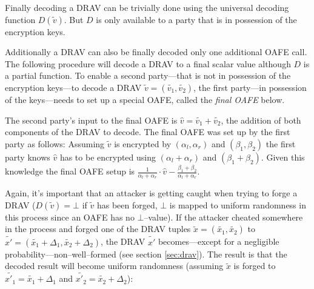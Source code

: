 \label{sec:drav-final-decoding}

Finally decoding a DRAV can be trivially done using the universal decoding
function $D(\widetilde{v})$. But $D$ is only available to a party that is in
possession of the encryption keys.

Additionally a DRAV can also be finally decoded only one additional OAFE call.
The following procedure will decode a DRAV to a final scalar value although
$D$ is a partial function. To enable a second party---that is not in possession
of the encryption keys---to decode a DRAV $\widetilde{v} = (\widetilde{v_1},
\widetilde{v_2})$, the first party---in possession of the keys---needs to set up
a special OAFE, called the \emph{final OAFE} below.

The second party's input to the final OAFE is $\widehat{v} = \widetilde{v_1} +
\widetilde{v_2}$, the addition of both components of the DRAV to decode.  The
final OAFE was set up by the first party as follows: Assuming $\widetilde{v}$ is
encrypted by $(\alpha_l, \alpha_r)$ and $(\beta_1, \beta_2)$ the first party
knows $\widehat{v}$ has to be encrypted using $(\alpha_l + \alpha_r)$ and
$(\beta_1 + \beta_2)$.  Given this knowledge the final OAFE setup is
$\frac{1}{\alpha_l + \alpha_r} \cdot \widehat{v} - \frac{\beta_1 +
\beta_2}{\alpha_l + \alpha_r}$.

Again, it's important that an attacker is getting caught when trying to forge a
DRAV ($D(\widetilde{v}) = \bot$ if $\widetilde{v}$ has been forged, $\bot$ is
mapped to uniform randomness in this process since an OAFE has no
$\bot$--value). If the attacker cheated somewhere in the process and forged one
of the DRAV tuples $\widetilde{x} = (\widetilde{x_1}, \widetilde{x_2})$ to
$\widetilde{x'} = (\widetilde{x_1} + \Delta_1, \widetilde{x_2} + \Delta_2)$, the
DRAV $\widetilde{x'}$ becomes---except for a negligible
probability---non--well--formed (see section \ref{sec:drav}). The result is that
the decoded result will become uniform randomness (assuming $\widetilde{x}$ is
forged to $\widetilde{x'_1} = \widetilde{x_1} + \Delta_1$ and $\widetilde{x'_2}
= \widetilde{x_2} + \Delta_2$):

